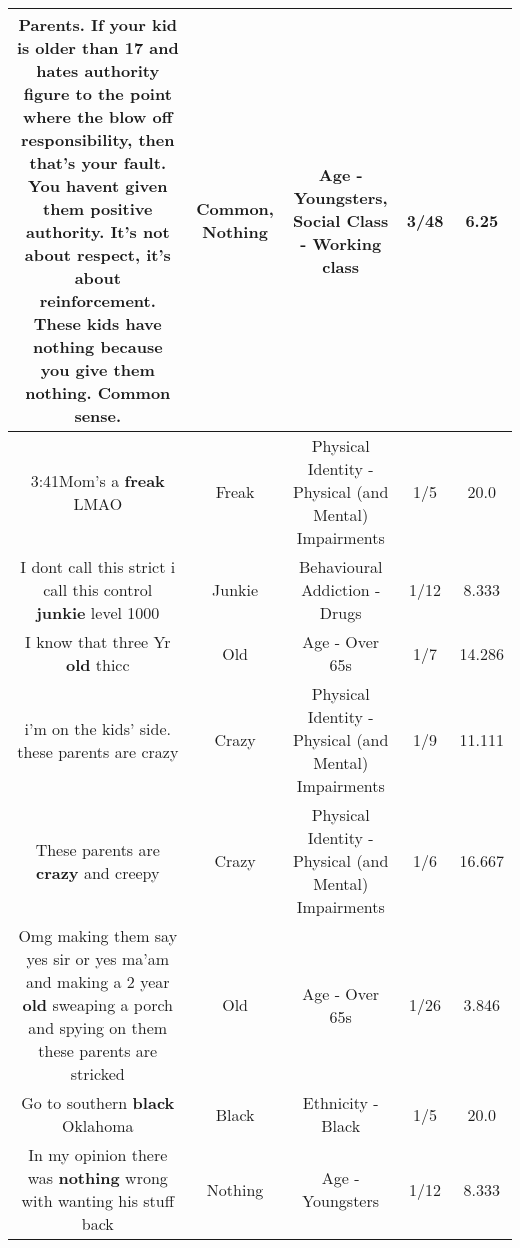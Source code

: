 \documentclass[11pt]{article}
\newlength\mylength
\begin{document}
\begin{center}
\begin{longtable}{|C{.65\mylength}|C{.30\mylength}|C{.12\mylength}|C{.12\mylength}|C{.12\mylength}|}
  \small Parents. If your kid is older than 17 and hates authority figure to the point where the blow off responsibility, then that's your fault. You havent given them positive authority. It's not about respect, it's about reinforcement. These kids have \textbf{nothing} because you give them \textbf{nothing}. \textbf{Common} sense.\normalsize   & Common, Nothing & Age - Youngsters, Social Class - Working class & 3/48 & 6.25 \\  \hline
  \small 3:41Mom's a \textbf{freak} LMAO\normalsize   & Freak & Physical Identity - Physical (and Mental) Impairments & 1/5 & 20.0 \\  \hline
  \small I dont call this strict i call this control \textbf{junkie} level 1000\normalsize   & Junkie & Behavioural Addiction - Drugs & 1/12 & 8.333 \\  \hline
  \small I know that three Yr \textbf{old} thicc\normalsize   & Old & Age - Over 65s & 1/7 & 14.286 \\  \hline
  \small i'm on the kids' side. these parents are crazy\normalsize   & Crazy & Physical Identity - Physical (and Mental) Impairments & 1/9 & 11.111 \\  \hline
  \small These parents are \textbf{crazy} and creepy\normalsize   & Crazy & Physical Identity - Physical (and Mental) Impairments & 1/6 & 16.667 \\  \hline
  \small Omg making them say yes sir or yes ma'am and making a 2 year \textbf{old} sweaping a porch and spying on them these parents are stricked\normalsize   & Old & Age - Over 65s & 1/26 & 3.846 \\  \hline
  \small Go to southern \textbf{black} Oklahoma\normalsize   & Black & Ethnicity - Black & 1/5 & 20.0 \\  \hline
  \small In my opinion there was \textbf{nothing} wrong with wanting his stuff back\normalsize   & Nothing & Age - Youngsters & 1/12 & 8.333 \\  \hline

\end{longtable}
\end{center}
\end{document}
